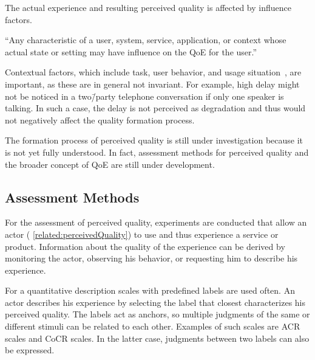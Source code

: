The actual experience and resulting perceived quality is affected by influence factors.
\begin{definition}
``Any characteristic of a user, system, service, application, or context whose actual state or setting may have influence on the \acl{QoE} for the user.''~\citep[][p.\,56]{reiter_factors_2014}
\end{definition}
Contextual factors, which include task, user behavior, and usage situation~\citep[][p.\,56]{reiter_factors_2014}, are important, as these are in general not invariant.
For example, high delay might not be noticed in a two\=/party telephone conversation if only one speaker is talking.
In such a case, the delay is not perceived as degradation and thus would not negatively affect the quality formation process.

The formation process of perceived quality is still under investigation because it is not yet fully understood. %
In fact, assessment methods for perceived quality and the broader concept of \ac{QoE} are still under development.

\subsection{Assessment Methods}
For the assessment of perceived quality, experiments are conducted that allow an actor (\cf{} \autoref{related:perceivedQuality}) to use and thus experience a service or product.
Information about the quality of the experience can be derived by monitoring the actor, observing his behavior, or requesting him to describe his experience.

For a quantitative description scales with predefined labels are used often.
An actor describes his experience by selecting the label that closest characterizes his perceived quality.
The labels act as anchors, so multiple judgments of the same or different stimuli can be related to each other.
Examples of such scales are \acf{ACR} scales and \acf{CoCR} scales.
In the latter case, judgments between two labels can also be expressed.

